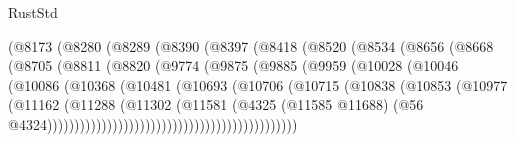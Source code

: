 \begin{lexlean}{RustStd}
\begin{coremodule}
{\begin{coremodule}
{{{{{{{{{{{{{{{{{{{{{{{{{{{{{{{{{{{{{{{{{{{{{{{{{{{{{{{{{{{{{{{{{{{{{{{{{{{{{{{{                            (@8173
                              (@8280
                                (@8289
                                  (@8390
                                    (@8397
                                      (@8418
                                        (@8520
                                          (@8534
                                            (@8656
                                              (@8668
                                                (@8705
                                                  (@8811
                                                    (@8820
                                                      (@9774
                                                        (@9875
                                                          (@9885
                                                            (@9959
                                                              (@10028
                                                                (@10046
                                                                  (@10086
                                                                    (@10368
                                                                      (@10481
                                                                        (@10693
                                                                          (@10706
                                                                            (@10715
                                                                              (@10838
                                                                                (@10853
                                                                                  (@10977
                                                                                    (@11162
                                                                                      (@11288
                                                                                        (@11302
                                                                                          (@11581
                                                                                            (@4325
                                                                                              (@11585
                                                                                                @11688)
                                                                                              (@56
                                                                                                @4324))))))))))))))))))))))))))))))))))))))))))))))
}}}}}}}}}}}}}}}}}}}}}}}}}}}}}}}}}}}}}}}}}}}}}}}}}}}}}}}}}}}}}}}}}}}}}}}}}}}}}}}}
\end{coremodule}}
\end{coremodule}
\end{lexlean}
